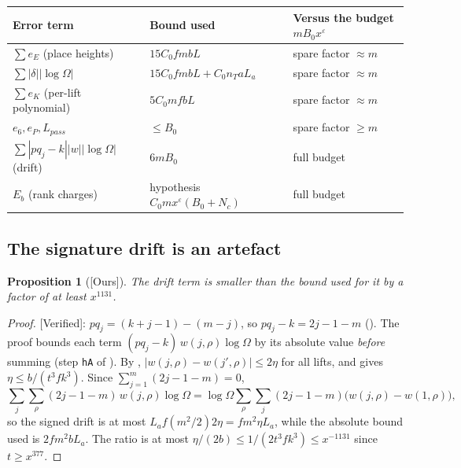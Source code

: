 \documentclass[11pt]{article}
\newcommand{\Verified}{\textcolor{verc}{\textsf{\small[Verified]}}}
\newcommand{\Ours}{\textcolor{oursc}{\textsf{\small[Ours]}}}
\newcommand{\eps}{\varepsilon}
\theoremstyle{plain}
\newtheorem{proposition}[theorem]{Proposition}
\theoremstyle{definition}
\begin{document}
\begin{center}
\renewcommand{\arraystretch}{1.15}
\begin{tabular}{@{}lll@{}}
\toprule
Error term & Bound used & Versus the budget $mB_0x^\eps$\\
\midrule
$\sum e_E$ (place heights) & $15C_0 f m b L$ & spare factor $\approx m$\\
$\sum|\delta||\log\Omega|$ & $15C_0fmbL + C_0n_TaL_a$ & spare factor $\approx m$\\
$\sum e_K$ (per-lift polynomial) & $5C_0 m f b L$ & spare factor $\approx m$\\
$e_6,e_P,L_{pass}$ & $\le B_0$ & spare factor $\ge m$\\
$\sum|pq_j-k||w||\log\Omega|$ (drift) & $6mB_0$ & full budget\\
$E_b$ (rank charges) & hypothesis $C_0mx^\eps(B_0+N_c)$ & full budget\\
\bottomrule
\end{tabular}
\end{center}

\subsection{The signature drift is an artefact}

\begin{proposition}[\Ours]\label{prop:drift}
The drift term is smaller than the bound used for it by a factor of at least $x^{1131}$.
\end{proposition}

\begin{proof}
\Verified: $pq_j=(k+j-1)-(m-j)$, so $pq_j-k=2j-1-m$ (). The proof bounds
each term $(pq_j-k)\,w(j,\rho)\log\Omega$ by its absolute value \emph{before} summing (step
\texttt{hA} of ). By ,
$|w(j,\rho)-w(j',\rho)|\le 2\eta$ for all lifts, and  gives
$\eta\le b/(t^3fk^3)$. Since $\sum_{j=1}^m(2j-1-m)=0$,
\[
\sum_j\sum_\rho(2j-1-m)\,w(j,\rho)\log\Omega=\log\Omega\sum_\rho\sum_j(2j-1-m)\bigl(w(j,\rho)-w(1,\rho)\bigr),
\]
so the signed drift is at most $L_a f(m^2/2)2\eta=fm^2\eta L_a$, while the absolute bound used is
$2fm^2bL_a$. The ratio is at most $\eta/(2b)\le 1/(2t^3fk^3)\le x^{-1131}$ since $t\ge x^{377}$.
\end{proof}
\end{document}
